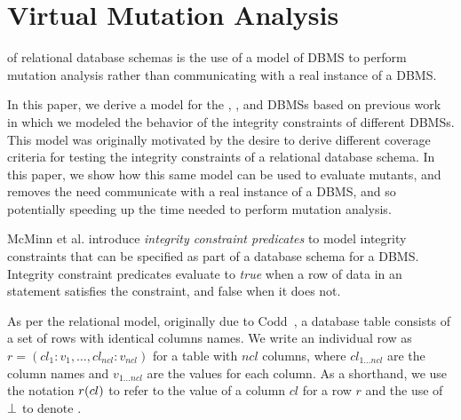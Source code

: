 
\vspace{-1ex}
\section{Virtual Mutation Analysis}
\label{sec:virtual-mutation-analysis}
\VMA of relational database schemas is the use of a model of DBMS to perform mutation analysis rather than communicating with a real instance of a DBMS. 

In this paper, we derive a model for the \HyperSQL, \Postgres, and \SQLite DBMSs based on previous work \cite{McMinn2015} in which we modeled the behavior of the integrity constraints of different DBMSs. This model was originally motivated by the desire to derive different coverage criteria for testing the integrity constraints of a relational database schema. In this paper, we show how this same model can be used to evaluate mutants, and removes the need communicate with a real instance of a DBMS, and so potentially speeding up the time needed to perform mutation analysis.

McMinn et al. introduce {\it integrity constraint predicates} to model integrity constraints that can be specified as part of a database schema for a DBMS. Integrity constraint predicates evaluate to {\it true} when a row of data in an \INSERT statement satisfies the constraint, and false when it does not.

As per the relational model, originally due to Codd~\cite{Codd1970}, a database table consists of a set of rows with identical columns names. We write an individual row as $r = (cl_1:v_1, \dots, cl_{ncl}:v_{ncl})$ for a table with $ncl$ columns, where $cl_{1 \ldots ncl}$ are the column names and $v_{1 \ldots ncl}$ are the values for each column. As a shorthand, we use the notation $r (cl)$ to refer to the value of a column $cl$ for a row $r$ and the use of $\bot$ to denote \NULL.

